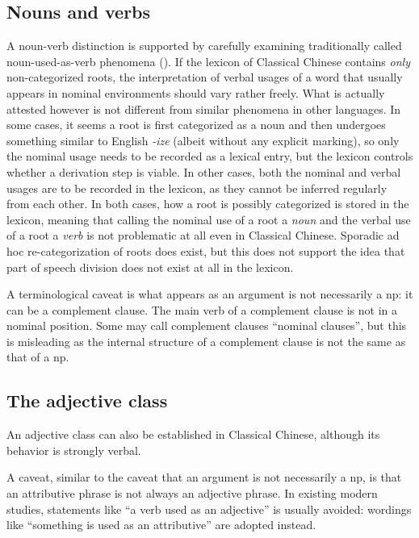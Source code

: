 \documentclass[UTF8, a4paper, oneside, scheme=plain, 12pt]{ctexrep}
\newcommand*{\term}[1]{\emph{#1}}
\newcommand{\form}[1]{\emph{#1}}
\begin{document}
\subsection{Nouns and verbs}

A noun-verb distinction is supported by carefully examining traditionally called noun-used-as-verb phenomena
().
If the lexicon of Classical Chinese contains \emph{only} non-categorized roots,
the interpretation of verbal usages of a word that usually appears in nominal environments
should vary rather freely.
What is actually attested however is not different from similar phenomena in other languages.
In some cases, it seems a root is first categorized as a noun 
and then undergoes something similar to English \form{-ize} (albeit without any explicit marking),
so only the nominal usage needs to be recorded as a lexical entry,
but the lexicon controls whether a derivation step is viable.
In other cases, 
both the nominal and verbal usages are to be recorded in the lexicon,
as they cannot be inferred regularly from each other.
In both cases, how a root is possibly categorized is stored in the lexicon,
meaning that calling the nominal use of a root a \term{noun} and the verbal use of a root a \term{verb}
is not problematic at all even in Classical Chinese.
Sporadic ad hoc re-categorization of roots does exist,
but this does not support the idea that part of speech division does not exist at all in the lexicon.

A terminological caveat is what appears as an argument is not necessarily a \ac{np}:
it can be a complement clause.
The main verb of a complement clause is not in a nominal position.
Some may call complement clauses ``nominal clauses'',
but this is misleading as the internal structure of a complement clause is not the same as that of a \ac{np}.

\subsection{The adjective class}

An adjective class can also be established in Classical Chinese,
although its behavior is strongly verbal. 

A caveat, similar to the caveat that an argument is not necessarily a \ac{np},
is that an attributive phrase is not always an adjective phrase.
In existing modern studies, statements like ``a verb used as an adjective'' is usually avoided:
wordings like ``something is used as an attributive'' are adopted instead.
\end{document}

